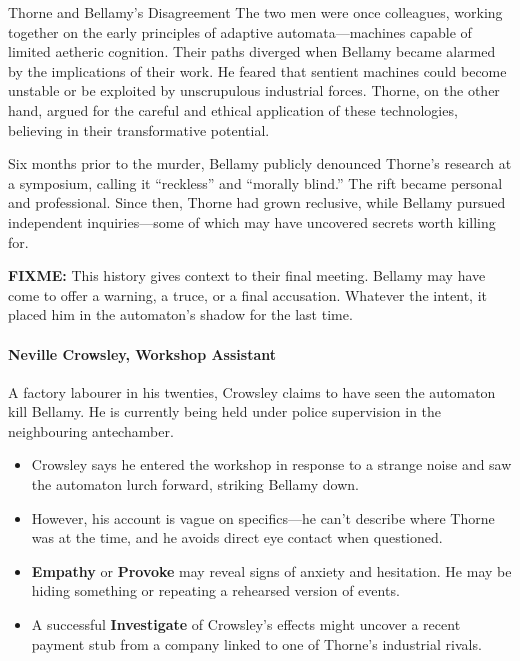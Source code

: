 \begin{CommentBox}{Thorne and Bellamy’s Disagreement}  
    The two men were once colleagues, working together on the early principles of adaptive automata—machines capable of limited aetheric cognition. Their paths diverged when Bellamy became alarmed by the implications of their work. He feared that sentient machines could become unstable or be exploited by unscrupulous industrial forces. Thorne, on the other hand, argued for the careful and ethical application of these technologies, believing in their transformative potential.
    
    Six months prior to the murder, Bellamy publicly denounced Thorne’s research at a symposium, calling it “reckless” and “morally blind.” The rift became personal and professional. Since then, Thorne had grown reclusive, while Bellamy pursued independent inquiries—some of which may have uncovered secrets worth killing for.
    
    \textbf{FIXME:} This history gives context to their final meeting. Bellamy may have come to offer a warning, a truce, or a final accusation. Whatever the intent, it placed him in the automaton’s shadow for the last time.
\end{CommentBox}


\vspace{\baselineskip}
\paragraph{Neville Crowsley, Workshop Assistant}
A factory labourer in his twenties, Crowsley claims to have seen the automaton kill Bellamy. He is currently being held under police supervision in the neighbouring antechamber.

\begin{itemize}
    \item Crowsley says he entered the workshop in response to a strange noise and saw the automaton lurch forward, striking Bellamy down.
    \item However, his account is vague on specifics—he can’t describe where Thorne was at the time, and he avoids direct eye contact when questioned.
    \item \textbf{Empathy}  or \textbf{Provoke}  may reveal signs of anxiety and hesitation. He may be hiding something or repeating a rehearsed version of events.
    \item A successful \textbf{Investigate}  of Crowsley’s effects might uncover a recent payment stub from a company linked to one of Thorne’s industrial rivals.
\end{itemize}

